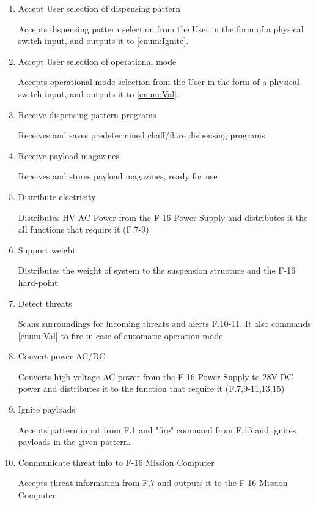 \documentclass[Main]{subfiles}
\begin{document}
\begin{enumerate}[label=F.\arabic*]
\item Accept User selection of dispensing pattern

Accepts dispensing pattern selection from the User in the form of a physical switch input, and outputs it to \ref{enum:Ignite}.

\item Accept User selection of operational mode

Accepts operational mode selection from the User in the form of a physical switch input, and outputs it to \ref{enum:Val}.

\item Receive dispensing pattern programs

Receives and saves predetermined chaff/flare dispensing programs

\item Receive payload magazines

Receives and stores payload magazines, ready for use

\item Distribute electricity

Distributes HV AC Power from the F-16 Power Supply and distributes it the all functions that require it (F.7-9)

\item Support weight

Distributes the weight of system to the suspension structure and the F-16 hard-point

\item Detect threats

Scans surroundings for incoming threats and alerts F.10-11. It also commands \ref{enum:Val} to fire in case of automatic operation mode.

\item Convert power AC/DC

Converts high voltage AC power from the F-16 Power Supply to 28V DC power and distributes it to the function that require it (F.7,9-11,13,15)

\item Ignite payloads\label{enum:Ignite}

Accepts pattern input from F.1 and "fire" command from F.15 and ignites payloads in the given pattern.

\item Communicate threat info to F-16 Mission Computer

Accepts threat information from F.7 and outputs it to the F-16 Mission Computer.


\end{enumerate}
\end{document}
